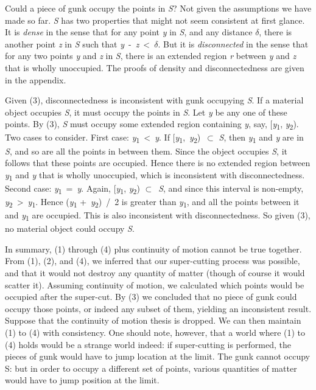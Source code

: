 \documentclass[
  11pt,
  letterpaper,
  DIV=11,
  numbers=noendperiod,
  twoside]{scrartcl}
\begin{document}
Could a piece of gunk occupy the points in \emph{S}? Not given the
assumptions we have made so far. \emph{S} has two properties that might
not seem consistent at first glance. It is \emph{dense} in the sense
that for any point \emph{y} in \emph{S}, and any distance \({\delta}\),
there is another point \emph{z} in \emph{S} such that
\emph{y}~-~\emph{z}~\textless~\({\delta}\). But it is
\emph{disconnected} in the sense that for any two points \emph{y} and
\emph{z} in \emph{S}, there is an extended region \emph{r} between
\emph{y} and \emph{z} that is wholly unoccupied. The proofs of density
and disconnectedness are given in the appendix.

Given (3), disconnectedness is inconsistent with gunk occupying
\emph{S}. If a material object occupies \emph{S}, it must occupy the
points in \emph{S}. Let \emph{y} be any one of these points. By (3),
\emph{S} must occupy some extended region containing \emph{y}, say,
{[}\emph{y}\textsubscript{1}, \emph{y}\textsubscript{2}). Two cases to
consider. First case: \emph{y}\textsubscript{1}~\textless~\emph{y}. If
{[}\emph{y}\textsubscript{1},~\emph{y}\textsubscript{2})~\({\subset}\)
\emph{S}, then \emph{y}\textsubscript{1} and \emph{y} are in \emph{S},
and so are all the points in between them. Since the object occupies
\emph{S}, it follows that these points are occupied. Hence there is no
extended region between \emph{y}\textsubscript{1} and \emph{y} that is
wholly unoccupied, which is inconsistent with disconnectedness. Second
case: \emph{y}\textsubscript{1}~=~\emph{y}. Again,
{[}\emph{y}\textsubscript{1}, \emph{y}\textsubscript{2})
\({\subset}\)~\emph{S}, and since this interval is non-empty,
\emph{y}\textsubscript{2}~\textgreater~\emph{y}\textsubscript{1}. Hence
(\emph{y}\textsubscript{1} +~\emph{y}\textsubscript{2})~/~2 is greater
than \emph{y}\textsubscript{1}, and all the points between it and
\emph{y}\textsubscript{1} are occupied. This is also inconsistent with
disconnectedness. So given (3), no material object could occupy
\emph{S}.

In summary, (1) through (4) plus continuity of motion cannot be true
together. From (1), (2), and (4), we inferred that our super-cutting
process was possible, and that it would not destroy any quantity of
matter (though of course it would scatter it). Assuming continuity of
motion, we calculated which points would be occupied after the
super-cut. By (3) we concluded that no piece of gunk could occupy those
points, or indeed any subset of them, yielding an inconsistent result.
Suppose that the continuity of motion thesis is dropped. We can then
maintain (1) to (4) with consistency. One should note, however, that a
world where (1) to (4) holds would be a strange world indeed: if
super-cutting is performed, the pieces of gunk would have to jump
location at the limit. The gunk cannot occupy S: but in order to occupy
a different set of points, various quantities of matter would have to
jump position at the limit.
\end{document}
